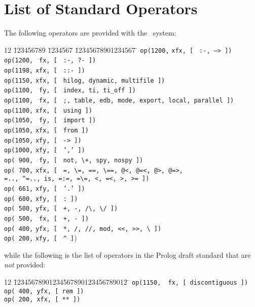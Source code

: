\section{List of Standard Operators} \label{operator_list}
The following operators are provided with the \ourprolog\ system:
\begin{tabbing}
12 \= 123456789 \= 1234567 \= 12345678901234567 \=	\kill
 \> {\tt op(1200,} \> \verb|xfx, [ | \> {\tt :-, --> ])}\>		\\
 \> {\tt op(1200,} \> \verb| fx, [ | \> {\tt :-, ?- ])}	\>		\\
 \> {\tt op(1198,} \> \verb|xfx, [ | \> {\tt ::- ])}	\>		\\
 \> {\tt op(1150,} \> \verb|xfx, [ | \> {\tt hilog, dynamic, multifile ])} \> \\
 \> {\tt op(1100,} \> \verb| fy, [ | \> {\tt index, ti, ti\_off ])}	\> \\
 \> {\tt op(1100,} \> \verb| fx, [ | \> {\tt ;, table, edb, mode, export,
						local, parallel ])} \> \\
 \> {\tt op(1100,} \> \verb|xfx, [ | \> {\tt using ])}	\>		\\
 \> {\tt op(1050,} \> \verb| fy, [ | \> {\tt import ])}	\>		\\
 \> {\tt op(1050,} \> \verb|xfx, [ | \> {\tt from ])}	\>		\\
 \> {\tt op(1050,} \> \verb|xfy, [ | \> {\tt -> ])}	\>		\\
 \> {\tt op(1000,} \> \verb|xfy, [ | \> {\tt ',' ])}	\>		\\
 \> {\tt op( 900,} \> \verb| fy, [ | \> {\verb|not, \+, spy, nospy ])|}  \> \\
 \> {\tt op( 700,} \> \verb|xfx, [ | \> {\verb|=, \=, ==, \==, @<, @=<, @>, @=>,|} \>	\\
 \>		   \>		     \> {\verb|=.., ^=.., is, =:=, =\=, <, =<, >, >= ])|}	\> \\
 \> {\tt op( 661,} \> \verb|xfy, [ | \> {\tt '.' ])}	\>		\\
 \> {\tt op( 600,} \> \verb|xfy, [ | \> {\verb|: ])|}	\>		\\
 \> {\tt op( 500,} \> \verb|yfx, [ | \> {\verb|+, -, /\, \/ ])|}	\> \\
 \> {\tt op( 500,} \> \verb| fx, [ | \> {\verb|+, - ])|}		\> \\
 \> {\tt op( 400,} \> \verb|yfx, [ | \> {\verb|*, /, //, mod, <<, >>, \ ])|} \>	\\
 \> {\tt op( 200,} \> \verb|xfy, [ | \> {\verb|^ ]|)}	\>	\\
\end{tabbing}
while the following is the list of operators in the Prolog draft standard
that are {\em not} provided:
\begin{tabbing}
12 \= 12345678901234567890123456789012 \=	\kill
 \> {\tt op(1150, \ fx, [ discontiguous ])}	\>		\\
 \> {\tt op( 400,  yfx, [ rem ])}	\>	\\
 \> {\tt op( 200,  xfx, [ ** ])}	\>	\\
\end{tabbing}

